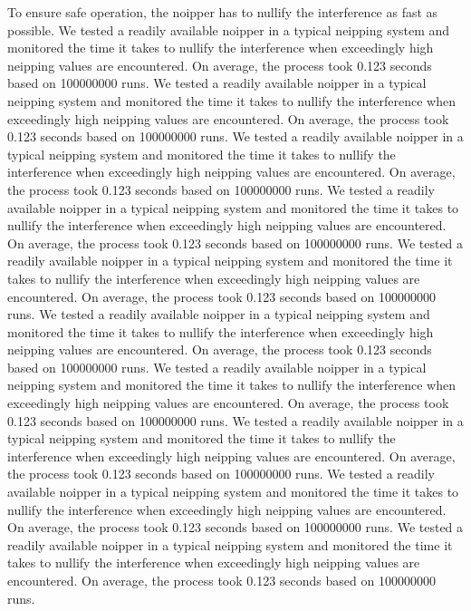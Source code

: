 To ensure safe operation, the noipper has to nullify the interference as fast as possible.
We tested a readily available noipper in a typical neipping system and monitored the time it takes to nullify the interference when exceedingly high neipping values are encountered. On average, the process took 0.123 seconds based on 100000000 runs.  
We tested a readily available noipper in a typical neipping system and monitored the time it takes to nullify the interference when exceedingly high neipping values are encountered. On average, the process took 0.123 seconds based on 100000000 runs.  
We tested a readily available noipper in a typical neipping system and monitored the time it takes to nullify the interference when exceedingly high neipping values are encountered. On average, the process took 0.123 seconds based on 100000000 runs.  
We tested a readily available noipper in a typical neipping system and monitored the time it takes to nullify the interference when exceedingly high neipping values are encountered. On average, the process took 0.123 seconds based on 100000000 runs.  
We tested a readily available noipper in a typical neipping system and monitored the time it takes to nullify the interference when exceedingly high neipping values are encountered. On average, the process took 0.123 seconds based on 100000000 runs.  
We tested a readily available noipper in a typical neipping system and monitored the time it takes to nullify the interference when exceedingly high neipping values are encountered. On average, the process took 0.123 seconds based on 100000000 runs.  
We tested a readily available noipper in a typical neipping system and monitored the time it takes to nullify the interference when exceedingly high neipping values are encountered. On average, the process took 0.123 seconds based on 100000000 runs.  
We tested a readily available noipper in a typical neipping system and monitored the time it takes to nullify the interference when exceedingly high neipping values are encountered. On average, the process took 0.123 seconds based on 100000000 runs.  
We tested a readily available noipper in a typical neipping system and monitored the time it takes to nullify the interference when exceedingly high neipping values are encountered. On average, the process took 0.123 seconds based on 100000000 runs.  
We tested a readily available noipper in a typical neipping system and monitored the time it takes to nullify the interference when exceedingly high neipping values are encountered. On average, the process took 0.123 seconds based on 100000000 runs.  
